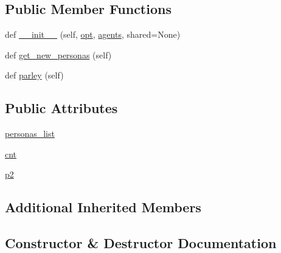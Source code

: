 \subsection*{Public Member Functions}
\begin{DoxyCompactItemize}
\item 
def \hyperlink{classparlai_1_1tasks_1_1convai2_1_1worlds_1_1InteractiveWorld_a5fb521abcaeae7438ab08feff1bdfccf}{\+\_\+\+\_\+init\+\_\+\+\_\+} (self, \hyperlink{classparlai_1_1core_1_1worlds_1_1World_a3640d92718acd3e6942a28c1ab3678bd}{opt}, \hyperlink{classparlai_1_1core_1_1worlds_1_1DialogPartnerWorld_a04185d1d55ca86c96c796f12f2226fc9}{agents}, shared=None)
\item 
def \hyperlink{classparlai_1_1tasks_1_1convai2_1_1worlds_1_1InteractiveWorld_acac91ca0d5cfc546437874e2f6d801a3}{get\+\_\+new\+\_\+personas} (self)
\item 
def \hyperlink{classparlai_1_1tasks_1_1convai2_1_1worlds_1_1InteractiveWorld_a75559c133b900cdd71389c9760e9a703}{parley} (self)
\end{DoxyCompactItemize}
\subsection*{Public Attributes}
\begin{DoxyCompactItemize}
\item 
\hyperlink{classparlai_1_1tasks_1_1convai2_1_1worlds_1_1InteractiveWorld_a544124310a84b4fb70abda3b41df5323}{personas\+\_\+list}
\item 
\hyperlink{classparlai_1_1tasks_1_1convai2_1_1worlds_1_1InteractiveWorld_a3caeecc4c52e4dce168341bbb1519b03}{cnt}
\item 
\hyperlink{classparlai_1_1tasks_1_1convai2_1_1worlds_1_1InteractiveWorld_a8f91a884b0bcb293335e3b7cb6404a1f}{p2}
\end{DoxyCompactItemize}
\subsection*{Additional Inherited Members}


\subsection{Constructor \& Destructor Documentation}
\mbox{\label{classparlai_1_1tasks_1_1convai2_1_1worlds_1_1InteractiveWorld_a5fb521abcaeae7438ab08feff1bdfccf}} 
